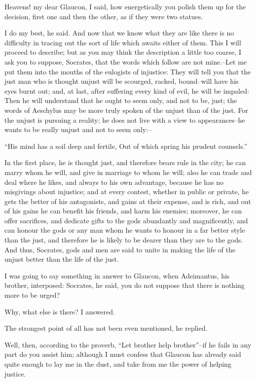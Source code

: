 Heavens! my dear Glaucon, I said, how energetically you polish them
up for the decision, first one and then the other, as if they were two
statues.

I do my best, he said. And now that we know what they are like there
is no difficulty in tracing out the sort of life which awaits either
of them. This I will proceed to describe; but as you may think the
description a little too coarse, I ask you to suppose, Socrates, that
the words which follow are not mine.--Let me put them into the mouths of
the eulogists of injustice: They will tell you that the just man who is
thought unjust will be scourged, racked, bound--will have his eyes
burnt out; and, at last, after suffering every kind of evil, he will be
impaled: Then he will understand that he ought to seem only, and not to
be, just; the words of Aeschylus may be more truly spoken of the unjust
than of the just. For the unjust is pursuing a reality; he does not live
with a view to appearances--he wants to be really unjust and not to seem
only:--

``His mind has a soil deep and fertile, Out of which spring his prudent
counsels.''

In the first place, he is thought just, and therefore bears rule in the
city; he can marry whom he will, and give in marriage to whom he
will; also he can trade and deal where he likes, and always to his own
advantage, because he has no misgivings about injustice; and at every
contest, whether in public or private, he gets the better of his
antagonists, and gains at their expense, and is rich, and out of his
gains he can benefit his friends, and harm his enemies; moreover, he
can offer sacrifices, and dedicate gifts to the gods abundantly and
magnificently, and can honour the gods or any man whom he wants to
honour in a far better style than the just, and therefore he is likely
to be dearer than they are to the gods. And thus, Socrates, gods and men
are said to unite in making the life of the unjust better than the life
of the just.

I was going to say something in answer to Glaucon, when Adeimantus, his
brother, interposed: Socrates, he said, you do not suppose that there is
nothing more to be urged?

Why, what else is there? I answered.

The strongest point of all has not been even mentioned, he replied.

Well, then, according to the proverb, ``Let brother help brother''--if
he fails in any part do you assist him; although I must confess that
Glaucon has already said quite enough to lay me in the dust, and take
from me the power of helping justice.

